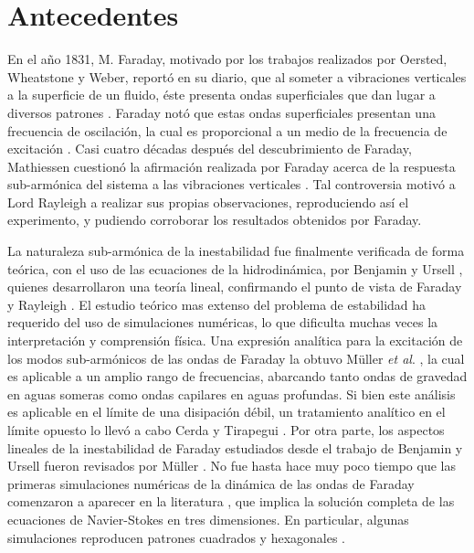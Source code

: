 \section*{Antecedentes} \label{S:2}

En el año 1831, M. Faraday, motivado por los trabajos realizados por Oersted, Wheatstone y Weber, reportó en su diario, que al someter a vibraciones verticales a la superficie de un fluido, éste presenta ondas superficiales que dan lugar a diversos patrones \cite{faraday1936faraday}. Faraday notó que estas ondas superficiales presentan una frecuencia de oscilación, la cual es proporcional a un medio de la frecuencia de excitación \cite{Faraday1831a}. Casi cuatro décadas después del descubrimiento de Faraday, Mathiessen cuestionó la afirmación realizada por Faraday acerca de la respuesta sub-armónica del sistema a las vibraciones verticales \cite{Matthiessen1868}. Tal controversia motivó a Lord Rayleigh a realizar sus propias observaciones\cite{LordRayleigh1883}, reproduciendo así el experimento, y pudiendo corroborar los resultados obtenidos por Faraday. \medskip \bigskip

La naturaleza sub-armónica de la inestabilidad fue finalmente verificada de forma teórica, con el uso de las ecuaciones de la hidrodinámica, por Benjamin y Ursell \cite{benjamin1954stability}, quienes desarrollaron una teoría lineal, confirmando el punto de vista de Faraday y Rayleigh \cite{Faraday1831a, LordRayleigh1883}. El estudio teórico mas extenso del problema de estabilidad ha requerido del uso de simulaciones numéricas, lo que dificulta muchas veces la interpretación y comprensión física. Una expresión analítica para la excitación de los modos sub-armónicos de las ondas de Faraday la obtuvo Müller \textit{et al}. \cite{muller1997analytic}, la cual es aplicable a un amplio rango de frecuencias, abarcando tanto ondas de gravedad en aguas someras como ondas capilares en aguas profundas. Si bien este análisis es aplicable en el límite de una disipación débil, un tratamiento analítico en el límite opuesto lo llevó a cabo Cerda y Tirapegui \cite{cerda1997faraday}. Por otra parte, los aspectos lineales de la inestabilidad de Faraday estudiados desde el trabajo de Benjamin y Ursell fueron revisados por Müller \cite{muller1998linear}. No fue hasta hace muy poco tiempo que las primeras simulaciones numéricas de la dinámica de las ondas de Faraday comenzaron a aparecer en la literatura \cite{takagi2015numerical, kahouadji2015numerical}, que implica la solución completa de las ecuaciones de Navier-Stokes en tres dimensiones. En particular, algunas simulaciones reproducen patrones cuadrados y hexagonales \cite{kityk2005spatiotemporal, kityk2009erratum}. \medskip \bigskip

